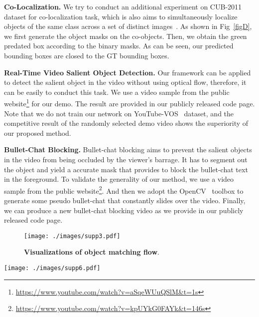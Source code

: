 \documentclass[journal]{IEEEtran}
\begin{document}
\noindent \textbf{Co-Localization.} We try to conduct an additional experiment on CUB-2011~\cite{wah2011caltech} dataset for co-localization task, which is also aims to simultaneously localize  objects of the same class across a set of distinct images~\cite{tang2014co}. 
As shown in Fig~\ref{figD}, we first generate the object masks on the co-objects. Then, we obtain the green predated box according to the binary masks. As can be seen, our predicted bounding boxes are closed to the GT bounding boxes.

\vspace{1ex}

\noindent \textbf{Real-Time Video Salient Object Detection.}
Our framework can be applied to detect the salient object in the video without using optical flow, therefore, it can be easily to conduct this task. We use a video sample from the public website\footnote[1]{ \url{https://www.youtube.com/watch?v=aSqeWUuQSlM&t=1s}} for our demo. The result are provided in our publicly released code page. Note that we do not train our network on YouTube-VOS~\cite{xu2018youtube} dataset, and the competitive result of the randomly selected demo video shows the 
superiority of our proposed method. 

\vspace{1ex}

\noindent \textbf{Bullet-Chat Blocking.} Bullet-chat blocking aims to prevent the salient objects in the video from being occluded by the viewer's barrage. It has to segment out the object and yield a accurate mask that provides to block the bullet-chat text in the foreground.
To validate the generality of our method, we use a video sample from the public website\footnote[2]{\url{https://www.youtube.com/watch?v=kpUYkG0FAYk&t=146s}}. And then we adopt the OpenCV~\cite{bradski2000opencv} toolbox to generate some pseudo bullet-chat that constantly slides over the video. 
Finally, we can produce a new bullet-chat blocking video as we provide in our publicly released code page.


\begin{figure}[t]
		\begin{center}
			\centering
			\texttt{[image: ./images/supp3.pdf]}
		\end{center}
		\caption{\textbf{Visualizations of object matching flow}.}
		\label{figC}
\end{figure}

\begin{figure*}[t]
		\begin{center}
			\centering
			\texttt{[image: ./images/supp6.pdf]}
		\end{center}
		\caption{\textbf{Visualizations of co-localization.} The 1 row are the input images, the 2 row are our predicted masks, and the 3 row are the localization results. The ground-truth bounding box is in {\color{red} red} and predicted bounding box is {\color{green} green}.}
		\label{figD}
\end{figure*}
\end{document}
